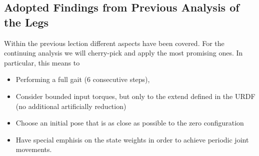 \subsection{Adopted Findings from Previous Analysis of the Legs}
Within the previous lection different aspects have been covered. For the continuing analysis we will cherry-pick and apply the most promising ones. In particular, this means to 
\begin{itemize}
\item Performing a full gait (6 consecutive steps),
\item Consider bounded input torques, but only to the extend defined in the URDF (no additional artificially reduction)
\item Choose an initial pose that is as close as possible to the zero configuration
\item Have special emphisis on the state weights in order to achieve periodic joint movements.
\end{itemize}

